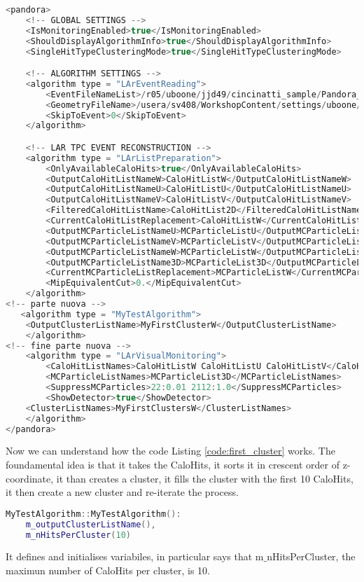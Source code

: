 \begin{lstlisting}[language=C++, label=code:first_cluster.xml, caption=PandoraSettings_Workshop.xml]
<pandora>
    <!-- GLOBAL SETTINGS -->
    <IsMonitoringEnabled>true</IsMonitoringEnabled>
    <ShouldDisplayAlgorithmInfo>true</ShouldDisplayAlgorithmInfo>
    <SingleHitTypeClusteringMode>true</SingleHitTypeClusteringMode>

    <!-- ALGORITHM SETTINGS -->
    <algorithm type = "LArEventReading">
        <EventFileNameList>/r05/uboone/jjd49/cincinatti_sample/Pandora_Events_Cincinatti_BNB_NuMu_1714.pndr</EventFileNameList>
        <GeometryFileName>/usera/sv408/WorkshopContent/settings/uboone/Geometry_MicroBooNE.xml</GeometryFileName>
        <SkipToEvent>0</SkipToEvent>
    </algorithm>

    <!-- LAR TPC EVENT RECONSTRUCTION -->
    <algorithm type = "LArListPreparation">
        <OnlyAvailableCaloHits>true</OnlyAvailableCaloHits>
        <OutputCaloHitListNameW>CaloHitListW</OutputCaloHitListNameW>
        <OutputCaloHitListNameU>CaloHitListU</OutputCaloHitListNameU>
        <OutputCaloHitListNameV>CaloHitListV</OutputCaloHitListNameV>
        <FilteredCaloHitListName>CaloHitList2D</FilteredCaloHitListName>
        <CurrentCaloHitListReplacement>CaloHitListW</CurrentCaloHitListReplacement>
        <OutputMCParticleListNameU>MCParticleListU</OutputMCParticleListNameU>
        <OutputMCParticleListNameV>MCParticleListV</OutputMCParticleListNameV>
        <OutputMCParticleListNameW>MCParticleListW</OutputMCParticleListNameW>
        <OutputMCParticleListName3D>MCParticleList3D</OutputMCParticleListName3D>
        <CurrentMCParticleListReplacement>MCParticleListW</CurrentMCParticleListReplacement>
        <MipEquivalentCut>0.</MipEquivalentCut>
    </algorithm>
<!-- parte nuova -->
   <algorithm type = "MyTestAlgorithm">
	<OutputClusterListName>MyFirstClusterW</OutputClusterListName>
    </algorithm>
<!-- fine parte nuova -->
    <algorithm type = "LArVisualMonitoring">
        <CaloHitListNames>CaloHitListW CaloHitListU CaloHitListV</CaloHitListNames>
        <MCParticleListNames>MCParticleList3D</MCParticleListNames>
        <SuppressMCParticles>22:0.01 2112:1.0</SuppressMCParticles>
        <ShowDetector>true</ShowDetector>
	<ClusterListNames>MyFirstClustersW</ClusterListNames>
    </algorithm>
</pandora>
\end{lstlisting}

Now we can understand how the code Listing \ref{code:first_cluster} works. The foundamental idea is that it takes the CaloHits, it sorts it in crescent order of z-coordinate, it than creates a cluster, it fills the cluster with the first 10 CaloHits, it then create a new cluster and re-iterate the process. 
\begin{lstlisting}[language=C++]
MyTestAlgorithm::MyTestAlgorithm():
	m_outputClusterListName(),
	m_nHitsPerCluster(10)
\end{lstlisting}
It defines and initialises variabiles, in particular says that m${\_}$nHitsPerCluster, the maximun number of CaloHits per cluster, is 10. 

